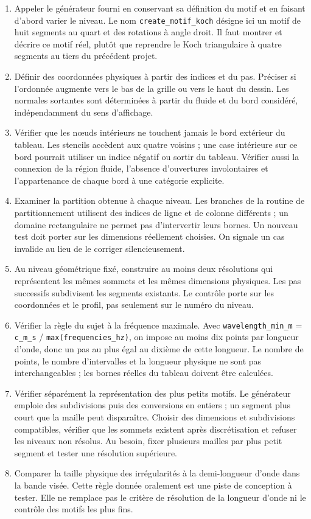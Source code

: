 \documentclass[11pt,a4paper]{article}
\begin{document}
\begin{enumerate}
\item Appeler le générateur fourni en conservant sa définition du motif et en faisant d'abord varier le niveau. Le nom {\small\ttfamily \nolinkurl{create_motif_koch}} désigne ici un motif de huit segments au quart et des rotations à angle droit. Il faut montrer et décrire ce motif réel, plutôt que reprendre le Koch triangulaire à quatre segments au tiers du précédent projet.
\item Définir des coordonnées physiques à partir des indices et du pas. Préciser si l'ordonnée augmente vers le bas de la grille ou vers le haut du dessin. Les normales sortantes sont déterminées à partir du fluide et du bord considéré, indépendamment du sens d'affichage.
\item Vérifier que les nœuds intérieurs ne touchent jamais le bord extérieur du tableau. Les stencils accèdent aux quatre voisins ; une case intérieure sur ce bord pourrait utiliser un indice négatif ou sortir du tableau. Vérifier aussi la connexion de la région fluide, l'absence d'ouvertures involontaires et l'appartenance de chaque bord à une catégorie explicite.
\item Examiner la partition obtenue à chaque niveau. Les branches de la routine de partitionnement utilisent des indices de ligne et de colonne différents ; un domaine rectangulaire ne permet pas d'intervertir leurs bornes. Un nouveau test doit porter sur les dimensions réellement choisies. On signale un cas invalide au lieu de le corriger silencieusement.
\item Au niveau géométrique fixé, construire au moins deux résolutions qui représentent les mêmes sommets et les mêmes dimensions physiques. Les pas successifs subdivisent les segments existants. Le contrôle porte sur les coordonnées et le profil, pas seulement sur le numéro du niveau.
\item Vérifier la règle du sujet à la fréquence maximale. Avec {\small\ttfamily \nolinkurl{wavelength_min_m} = \nolinkurl{c_m_s} / \nolinkurl{max(frequencies_hz)}}, on impose au moins dix points par longueur d'onde, donc un pas au plus égal au dixième de cette longueur. Le nombre de points, le nombre d'intervalles et la longueur physique ne sont pas interchangeables ; les bornes réelles du tableau doivent être calculées.
\item Vérifier séparément la représentation des plus petits motifs. Le générateur emploie des subdivisions puis des conversions en entiers ; un segment plus court que la maille peut disparaître. Choisir des dimensions et subdivisions compatibles, vérifier que les sommets existent après discrétisation et refuser les niveaux non résolus. Au besoin, fixer plusieurs mailles par plus petit segment et tester une résolution supérieure.
\item Comparer la taille physique des irrégularités à la demi-longueur d'onde dans la bande visée. Cette règle donnée oralement est une piste de conception à tester. Elle ne remplace pas le critère de résolution de la longueur d'onde ni le contrôle des motifs les plus fins.
\end{enumerate}
\end{document}
